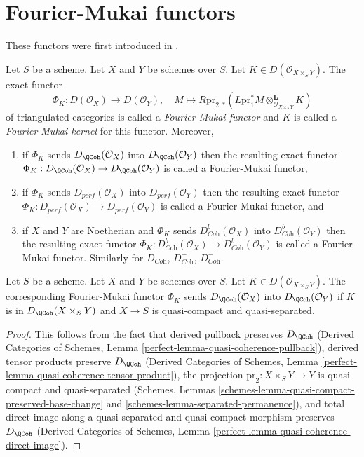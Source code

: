 \section{Fourier-Mukai functors}
\label{section-fourier-mukai}

\noindent
These functors were first introduced in \cite{Mukai}.

\begin{definition}
\label{definition-fourier-mukai-functor}
Let $S$ be a scheme. Let $X$ and $Y$ be schemes over $S$.
Let $K \in D(\mathcal{O}_{X \times_S Y})$. The exact functor
$$
\Phi_K : D(\mathcal{O}_X) \longrightarrow D(\mathcal{O}_Y),\quad
M \longmapsto R\text{pr}_{2, *}(
L\text{pr}_1^*M \otimes_{\mathcal{O}_{X \times_S Y}}^\mathbf{L} K)
$$
of triangulated categories is called a {\it Fourier-Mukai functor}
and $K$ is called a {\it Fourier-Mukai kernel} for this functor.
Moreover,
\begin{enumerate}
\item if $\Phi_K$ sends $D_\QCoh(\mathcal{O}_X)$ into $D_\QCoh(\mathcal{O}_Y)$
then the resulting exact functor
$\Phi_K : D_\QCoh(\mathcal{O}_X) \to D_\QCoh(\mathcal{O}_Y)$
is called a Fourier-Mukai functor,
\item if $\Phi_K$ sends $D_{perf}(\mathcal{O}_X)$ into
$D_{perf}(\mathcal{O}_Y)$ then the resulting exact functor
$\Phi_K : D_{perf}(\mathcal{O}_X) \to D_{perf}(\mathcal{O}_Y)$
is called a Fourier-Mukai functor, and
\item if $X$ and $Y$ are Noetherian and $\Phi_K$ sends
$D^b_{\textit{Coh}}(\mathcal{O}_X)$ into $D^b_{\textit{Coh}}(\mathcal{O}_Y)$
then the resulting exact functor
$\Phi_K : D^b_{\textit{Coh}}(\mathcal{O}_X) \to
D^b_{\textit{Coh}}(\mathcal{O}_Y)$
is called a Fourier-Mukai functor.
Similarly for $D_{\textit{Coh}}$, $D^+_{\textit{Coh}}$, $D^-_{\textit{Coh}}$.
\end{enumerate}
\end{definition}

\begin{lemma}
\label{lemma-fourier-Mukai-QCoh}
Let $S$ be a scheme. Let $X$ and $Y$ be schemes over $S$.
Let $K \in D(\mathcal{O}_{X \times_S Y})$.
The corresponding Fourier-Mukai functor $\Phi_K$ sends
$D_\QCoh(\mathcal{O}_X)$ into $D_\QCoh(\mathcal{O}_Y)$
if $K$ is in $D_\QCoh(X \times_S Y)$ and $X \to S$ is
quasi-compact and quasi-separated.
\end{lemma}

\begin{proof}
This follows from the fact that derived pullback preserves
$D_\QCoh$
(Derived Categories of Schemes, Lemma
\ref{perfect-lemma-quasi-coherence-pullback}),
derived tensor products preserve $D_\QCoh$
(Derived Categories of Schemes, Lemma
\ref{perfect-lemma-quasi-coherence-tensor-product}),
the projection $\text{pr}_2 : X \times_S Y \to Y$ is
quasi-compact and quasi-separated
(Schemes, Lemmas
\ref{schemes-lemma-quasi-compact-preserved-base-change} and
\ref{schemes-lemma-separated-permanence}), and
total direct image along a quasi-separated and quasi-compact
morphism preserves $D_\QCoh$
(Derived Categories of Schemes, Lemma
\ref{perfect-lemma-quasi-coherence-direct-image}).
\end{proof}

